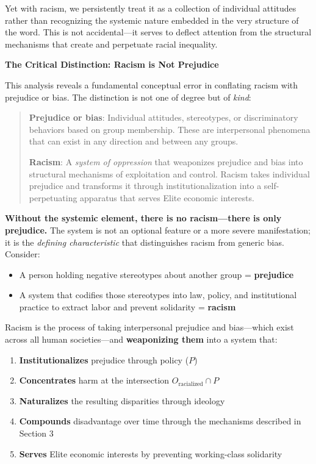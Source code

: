 \documentclass[12pt]{article}
\begin{document}
Yet with racism, we persistently treat it as a collection of individual attitudes rather than recognizing the systemic nature embedded in the very structure of the word. This is not accidental---it serves to deflect attention from the structural mechanisms that create and perpetuate racial inequality.

\textbf{The Critical Distinction: Racism is Not Prejudice}

This analysis reveals a fundamental conceptual error in conflating racism with prejudice or bias. The distinction is not one of degree but of \textit{kind}:

\begin{quote}
\textbf{Prejudice or bias}: Individual attitudes, stereotypes, or discriminatory behaviors based on group membership. These are interpersonal phenomena that can exist in any direction and between any groups.

\textbf{Racism}: A \textit{system of oppression} that weaponizes prejudice and bias into structural mechanisms of exploitation and control. Racism takes individual prejudice and transforms it through institutionalization into a self-perpetuating apparatus that serves Elite economic interests.
\end{quote}

\textbf{Without the systemic element, there is no racism---there is only prejudice.} The system is not an optional feature or a more severe manifestation; it is the \textit{defining characteristic} that distinguishes racism from generic bias. Consider:

\begin{itemize}
    \item A person holding negative stereotypes about another group = \textbf{prejudice}
    \item A system that codifies those stereotypes into law, policy, and institutional practice to extract labor and prevent solidarity = \textbf{racism}
\end{itemize}

Racism is the process of taking interpersonal prejudice and bias---which exist across all human societies---and \textbf{weaponizing them} into a system that:
\begin{enumerate}
    \item \textbf{Institutionalizes} prejudice through policy ($P$)
    \item \textbf{Concentrates} harm at the intersection $O_{\text{racialized}} \cap P$
    \item \textbf{Naturalizes} the resulting disparities through ideology
    \item \textbf{Compounds} disadvantage over time through the mechanisms described in Section 3
    \item \textbf{Serves} Elite economic interests by preventing working-class solidarity
\end{enumerate}
\end{document}
